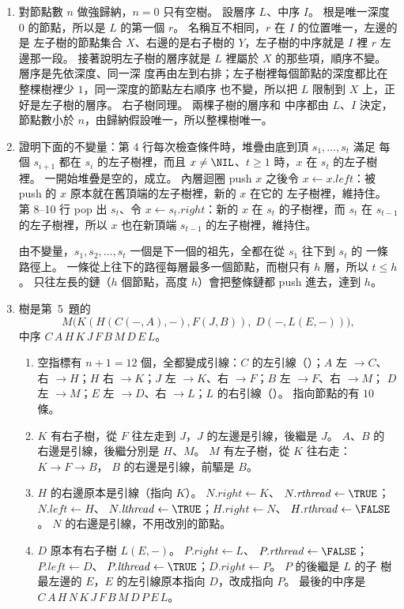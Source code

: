 \begin{enumerate}
\item 對節點數 $n$ 做強歸納，$n = 0$ 只有空樹。 設層序 $L$、中序 $I$。 根是唯一深度
$0$ 的節點，所以是 $L$ 的第一個 $r$。 名稱互不相同，$r$ 在 $I$ 的位置唯一，左邊的是
左子樹的節點集合 $X$、右邊的是右子樹的 $Y$，左子樹的中序就是 $I$ 裡 $r$ 左邊那一段。
接著說明左子樹的層序就是 $L$ 裡屬於 $X$ 的那些項，順序不變。 層序是先依深度、同一深
度再由左到右排；左子樹裡每個節點的深度都比在整棵樹裡少 $1$，同一深度的節點左右順序
也不變，所以把 $L$ 限制到 $X$ 上，正好是左子樹的層序。 右子樹同理。 兩棵子樹的層序和
中序都由 $L$、$I$ 決定，節點數小於 $n$，由歸納假設唯一，所以整棵樹唯一。

\item 證明下面的不變量：第 4 行每次檢查條件時，堆疊由底到頂 $s_1, \ldots, s_t$ 滿足
每個 $s_{i+1}$ 都在 $s_i$ 的左子樹裡，而且 $x \ne \NIL$、$t \ge 1$ 時，$x$ 在 $s_t$
的左子樹裡。 一開始堆疊是空的，成立。 內層迴圈 push $x$ 之後令
$x \gets x.\mathit{left}$：被 push 的 $x$ 原本就在舊頂端的左子樹裡，新的 $x$ 在它的
左子樹裡，維持住。 第 8--10 行 pop 出 $s_t$、令 $x \gets s_t.\mathit{right}$：新的
$x$ 在 $s_t$ 的子樹裡，而 $s_t$ 在 $s_{t-1}$ 的左子樹裡，所以 $x$ 也在新頂端
$s_{t-1}$ 的左子樹裡，維持住。

由不變量，$s_1, s_2, \ldots, s_t$ 一個是下一個的祖先，全都在從 $s_1$ 往下到 $s_t$ 的
一條路徑上。 一條從上往下的路徑每層最多一個節點，而樹只有 $h$ 層，所以 $t \le h$。
只往左長的鏈（$h$ 個節點，高度 $h$）會把整條鏈都 push 進去，達到 $h$。

\item 樹是第~5~題的
\[
M\bigl(K(H(C(-, A), -), F(J, B)),\; D(-, L(E, -))\bigr),
\]
中序 $C\,A\,H\,K\,J\,F\,B\,M\,D\,E\,L$。
\begin{enumerate}
\item 空指標有 $n + 1 = 12$ 個，全都變成引線：$C$ 的左引線（\NIL）；$A$ 左 $\to C$、
右 $\to H$；$H$ 右 $\to K$；$J$ 左 $\to K$、右 $\to F$；$B$ 左 $\to F$、右 $\to M$；
$D$ 左 $\to M$；$E$ 左 $\to D$、右 $\to L$；$L$ 的右引線（\NIL）。 指向節點的有
$10$ 條。
\item $K$ 有右子樹，從 $F$ 往左走到 $J$，$J$ 的左邊是引線，後繼是 $J$。 $A$、$B$ 的
右邊是引線，後繼分別是 $H$、$M$。 $M$ 有左子樹，從 $K$ 往右走：$K \to F \to B$，
$B$ 的右邊是引線，前驅是 $B$。
\item $H$ 的右邊原本是引線（指向 $K$）。 $N.\mathit{right} \gets K$、
$N.\mathit{rthread} \gets \TRUE$；$N.\mathit{left} \gets H$、
$N.\mathit{lthread} \gets \TRUE$；$H.\mathit{right} \gets N$、
$H.\mathit{rthread} \gets \FALSE$。 $N$ 的右邊是引線，不用改別的節點。
\item $D$ 原本有右子樹 $L(E, -)$。 $P.\mathit{right} \gets L$、
$P.\mathit{rthread} \gets \FALSE$；$P.\mathit{left} \gets D$、
$P.\mathit{lthread} \gets \TRUE$；$D.\mathit{right} \gets P$。 $P$ 的後繼是 $L$ 的子
樹最左邊的 $E$，$E$ 的左引線原本指向 $D$，改成指向 $P$。 最後的中序是
$C\,A\,H\,N\,K\,J\,F\,B\,M\,D\,P\,E\,L$。
\end{enumerate}


\end{enumerate}
